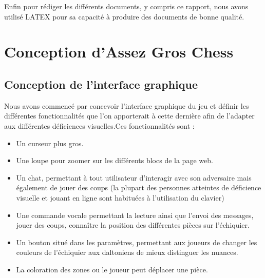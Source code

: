 \documentclass[12pt, openany]{report}
\begin{document}
Enfin pour rédiger les différents documents, y compris ce rapport, nous avons utilisé LATEX pour sa capacité à produire des documents de bonne qualité.




\chapter{Conception d'Assez Gros Chess }
\section{Conception de l'interface graphique}
Nous avons commencé par concevoir l’interface graphique du jeu et définir les différentes fonctionnalités que l’on apporterait à cette dernière afin de l’adapter aux différentes déficiences visuelles.Ces fonctionnalités sont : \begin{itemize}
    \item Un curseur plus gros.
    \item Une loupe pour zoomer sur les différents blocs de la page web.
    \item  Un chat, permettant à tout utilisateur d’interagir avec son adversaire mais également de jouer des coups (la plupart des personnes atteintes de déficience visuelle et jouant en ligne sont habituées à l’utilisation du clavier)
    \item Une commande vocale permettant la lecture ainsi que l’envoi des messages, jouer des coups, connaître la position des différentes pièces sur l’échiquier.
    \item Un bouton situé dans les paramètres, permettant aux joueurs de changer les couleurs de l’échiquier aux daltoniens  de mieux distinguer les nuances.
    \item La coloration des zones ou le joueur peut déplacer une pièce.
\end{itemize}{}
\end{document}
